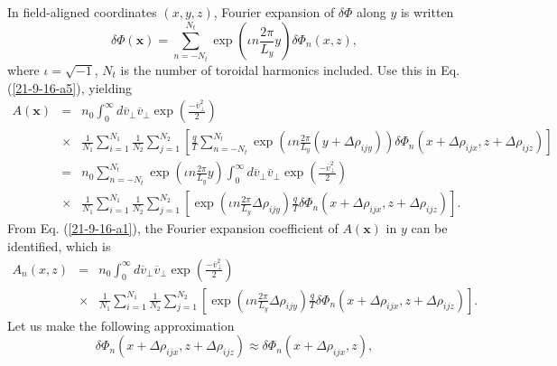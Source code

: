 \documentclass{article}
\begin{document}
In field-aligned coordinates $(x, y, z)$, Fourier expansion of $\delta \Phi$
along $y$ is written
\begin{equation}
  \delta \Phi (\mathbf{x}) = \sum_{n = - N_t}^{N_t} \exp \left( \iota n
  \frac{2 \pi}{L_y} y \right) \delta \Phi_n (x, z),
\end{equation}
where $\iota = \sqrt{- 1}$, $N_t$ is the number of toroidal harmonics
included. Use this in Eq. (\ref{21-9-16-a5}), yielding
\begin{eqnarray}
  A (\mathbf{x}) & = & n_0  \int_0^{\infty} d \overline{v}_{\perp}
  \overline{v}_{\perp} \exp \left( \frac{- \overline{v}^2_{\perp}}{2} \right)
  \nonumber\\
  & \times & \frac{1}{N_1} \sum_{i = 1}^{N_1} \frac{1}{N_2}  \sum_{j =
  1}^{N_2} \left[ \frac{q}{T}  \sum_{n = - N_t}^{N_t} \exp \left( \iota n
  \frac{2 \pi}{L_y} (y + \Delta \rho_{i j y}) \right) \delta \Phi_n (x +
  \Delta \rho_{i j x}, z + \Delta \rho_{i j z}) \right] \nonumber\\
  & = & n_0  \sum_{n = - N_t}^{N_t} \exp \left( \iota n \frac{2 \pi}{L_y} y
  \right) \int_0^{\infty} d \overline{v}_{\perp} \overline{v}_{\perp} \exp
  \left( \frac{- \overline{v}^2_{\perp}}{2} \right) \nonumber\\
  & \times & \frac{1}{N_1} \sum_{i = 1}^{N_1} \frac{1}{N_2}  \sum_{j =
  1}^{N_2} \left[ \exp \left( \iota n \frac{2 \pi}{L_y} \Delta \rho_{i j y}
  \right) \frac{q}{T} \delta \Phi_n (x + \Delta \rho_{i j x}, z + \Delta
  \rho_{i j z}) \right] .  \label{21-9-16-a1}
\end{eqnarray}
From Eq. (\ref{21-9-16-a1}), the Fourier expansion coefficient of $A
(\mathbf{x})$ in $y$ can be identified, which is
\begin{eqnarray}
  A_n (x, z) & = & n_0  \int_0^{\infty} d \overline{v}_{\perp}
  \overline{v}_{\perp} \exp \left( \frac{- \overline{v}^2_{\perp}}{2} \right)
  \nonumber\\
  & \times & \frac{1}{N_1} \sum_{i = 1}^{N_1} \frac{1}{N_2}  \sum_{j =
  1}^{N_2} \left[ \exp \left( \iota n \frac{2 \pi}{L_y} \Delta \rho_{i j y}
  \right) \frac{q}{T} \delta \Phi_n (x + \Delta \rho_{i j x}, z + \Delta
  \rho_{i j z}) \right] .  \label{22-12-21-1}
\end{eqnarray}
Let us make the following approximation
\begin{equation}
  \label{22-12-21-3} \delta \Phi_n (x + \Delta \rho_{i j x}, z + \Delta
  \rho_{i j z}) \approx \delta \Phi_n (x + \Delta \rho_{i j x}, z),
\end{equation}
\end{document}
